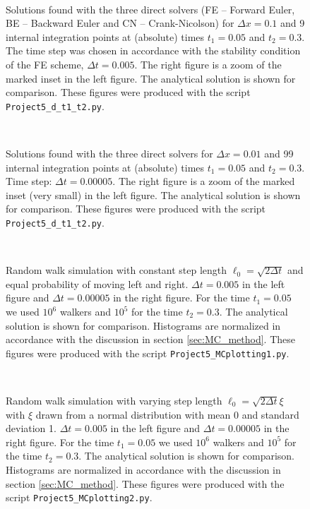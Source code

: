 \documentclass[a4paper, 11pt, notitlepage,english]{article}
\begin{document}
\begin{figure}[h!tb]
 \centering
 \mbox{\quad
 }
 \caption{Solutions found with the three direct solvers (FE – Forward Euler, BE – Backward Euler and CN – Crank-Nicolson) for $\Delta x = 0.1$ and 9 internal integration points at (absolute) times $t_1 = 0.05$ and $t_2 = 0.3$. The time step was chosen in accordance with the stability condition of the FE scheme, $\Delta t = 0.005$. The right figure is a zoom of the marked inset in the left figure. The analytical solution is shown for comparison. These figures were produced with the script \texttt{Project5\_d\_t1\_t2.py}.}
\label{fig:Three_methods10}
\end{figure}

\begin{figure}[h!tb]
 \centering
 \mbox{\quad
 }
 \caption{Solutions found with the three direct solvers for $\Delta x = 0.01$ and 99 internal integration points at (absolute) times $t_1 = 0.05$ and $t_2 = 0.3$. Time step: $\Delta t = 0.00005$. The right figure is a zoom of the marked inset (very small) in the left figure. The analytical solution is shown for comparison. These figures were produced with the script \texttt{Project5\_d\_t1\_t2.py}.}
\label{fig:Three_methods100}
\end{figure}

\begin{figure}[h!tb]
 \centering
 \mbox{\quad
 }
 \caption{Random walk simulation with constant step length $\ell_0 = \sqrt{2\Delta t}$ and equal probability of moving left and right. $\Delta t = 0.005$ in the left figure and $\Delta t = 0.00005$ in the right figure. For the time $t_1 = 0.05$ we used $10^6$ walkers and $10^5$ for the time $t_2 = 0.3$. The analytical solution is shown for comparison. Histograms are normalized in accordance with the discussion in section \ref{sec:MC_method}. These figures were produced with the script \texttt{Project5\_MCplotting1.py}.}
\label{fig:MC_uniform}
\end{figure}

\begin{figure}[h!tb]
 \centering
 \mbox{\quad
 }
 \caption{Random walk simulation with varying step length $\ell_0 = \sqrt{2\Delta t}\xi$ with $\xi$ drawn from a normal distribution with mean 0 and standard deviation 1. $\Delta t = 0.005$ in the left figure and $\Delta t = 0.00005$ in the right figure. For the time $t_1 = 0.05$ we used $10^6$ walkers and $10^5$ for the time $t_2 = 0.3$. The analytical solution is shown for comparison. Histograms are normalized in accordance with the discussion in section \ref{sec:MC_method}. These figures were produced with the script \texttt{Project5\_MCplotting2.py}.}
\label{fig:MC_gaussian}
\end{figure}
\end{document}
